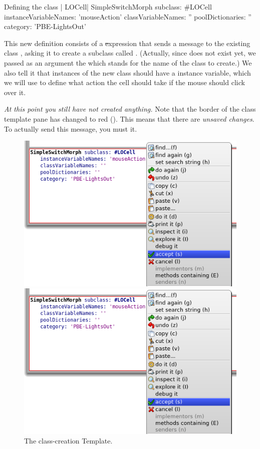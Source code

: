 \documentclass[a4paper,10pt,twoside]{book}
\begin{document}
\begin{classdef}[firstClassDef]{Defining the class \ct| LOCell|}
SimpleSwitchMorph subclass: #LOCell
   instanceVariableNames: 'mouseAction'
   classVariableNames: ''
   poolDictionaries: ''
   category: 'PBE-LightsOut'
\end{classdef}

This new definition consists of a \st expression that sends a message to the existing class , asking it to create a subclass called .
(Actually, since  does not exist yet, we passed as an argument the   which stands for the name of the class to create.)
We also tell it that instances of the new class should have a  instance variable, which we will use to define what action the cell should take if the mouse should click over it.

\emph{At this point you still have not created anything.}
Note that the border of the class template pane has changed to red ().
This means that there are \emph{unsaved changes}.
To actually send this message, you must  it.

\begin{figure}[h!t]
\ifluluelse
	{\centerline {\includegraphics[width=\textwidth]{AcceptClassDef}}}
	{\centerline {\includegraphics[scale=0.7]{AcceptClassDef}}}
\caption{The class-creation Template.
}
\end{figure}
\end{document}
